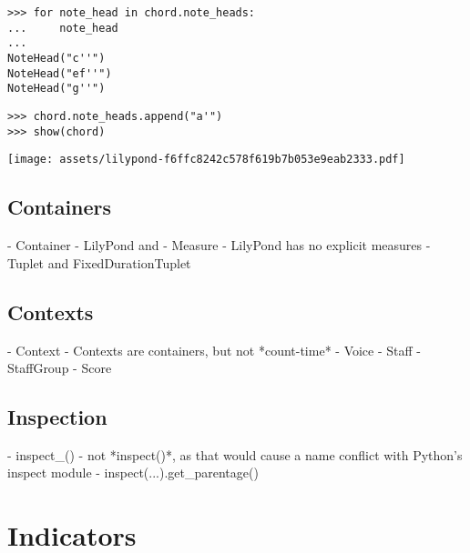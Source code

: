\begin{abjadbookoutput}
\begin{singlespacing}
\vspace{-0.5\baselineskip}
\begin{lstlisting}
>>> for note_head in chord.note_heads:
...     note_head
...
NoteHead("c''")
NoteHead("ef''")
NoteHead("g''")
\end{lstlisting}
\begin{lstlisting}
>>> chord.note_heads.append("a'")
>>> show(chord)
\end{lstlisting}
\noindent\texttt{[image: assets/lilypond-f6ffc8242c578f619b7b053e9eab2333.pdf]}
\end{singlespacing}
\end{abjadbookoutput}

\subsection{Containers}

\begin{markdown}
-   Container
-   LilyPond and { }
-   Measure
-   LilyPond has no explicit measures
-   Tuplet and FixedDurationTuplet
\end{markdown}

\subsection{Contexts}

\begin{markdown}
-   Context
-   Contexts are containers, but not *count-time*
-   Voice
-   Staff
-   StaffGroup
-   Score
\end{markdown}

\subsection{Inspection}

\begin{markdown}
-   inspect_()
-   not *inspect()*, as that would cause a name conflict with Python's inspect
    module
-   inspect(...).get_parentage()
\end{markdown}

\section{Indicators}

